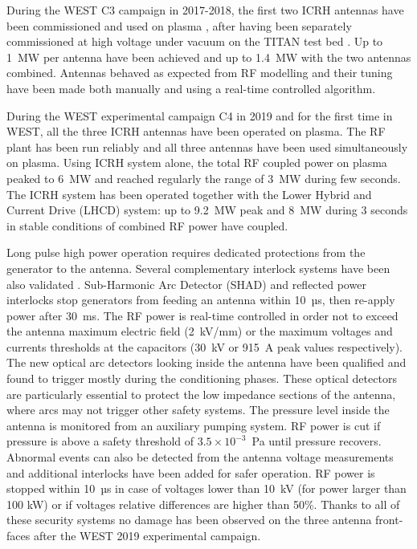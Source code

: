 {During the WEST C3 campaign in 2017-2018, the first two ICRH antennas have been commissioned and used on plasma , after having been separately commissioned at high voltage under vacuum on the TITAN test bed . Up to 1~MW per antenna have been achieved and up to 1.4~MW with the two antennas combined. Antennas behaved as expected from RF modelling and their tuning have been made both manually and using a real-time controlled algorithm. 

During the WEST experimental campaign C4 in 2019 and for the first time in WEST, all the three ICRH antennas have been operated on plasma. The RF plant has been run reliably and all three antennas have been used simultaneously on plasma. Using ICRH system alone, the total RF coupled power on plasma peaked to 6~MW and reached regularly the range of 3~MW during few seconds. The ICRH system has been operated together with the Lower Hybrid and Current Drive (LHCD) system: up to 9.2~MW peak and 8~MW during 3 seconds in stable conditions of combined RF power have coupled.

Long pulse high power operation requires dedicated protections from the generator to the antenna. Several complementary interlock systems have been also validated \cite{helou2019}. Sub-Harmonic Arc Detector (SHAD) and reflected power interlocks stop generators from feeding an antenna within 10~µs, then re-apply power after 30~ms. The RF power is real-time controlled in order not to exceed the antenna maximum electric field (2~kV/mm) or the maximum voltages and currents thresholds at the capacitors (30~kV or 915~A peak values respectively). The new optical arc detectors looking inside the antenna have been qualified and found to trigger mostly during the conditioning phases. These optical detectors are particularly essential to protect the low impedance sections of the antenna, where arcs may not trigger other safety systems. The pressure level inside the antenna is monitored from an auxiliary pumping system.  RF power is cut if pressure is above a safety threshold of $3.5\times10^{-3}$~Pa until pressure recovers. Abnormal events can also be detected from the antenna voltage measurements and additional interlocks have been added for safer operation. RF power is stopped within 10~µs in case of voltages lower than 10~kV (for power larger than 100 kW) or if voltages relative differences are higher than 50\%. Thanks to all of these security systems no damage has been observed on the three antenna front-faces after the WEST 2019 experimental campaign.

}
